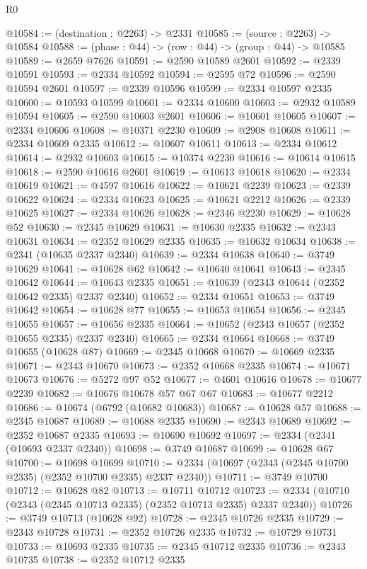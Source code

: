 \begin{lexlean}{R0}
\begin{coremodule}
@10584 := (destination : @2263) -> @2331
@10585 := (source : @2263) -> @10584
@10588 := (phase : @44) -> (row : @44) -> (group : @44) -> @10585
@10589 := @2659 @7626
@10591 := @2590 @10589 @2601
@10592 := @2339 @10591
@10593 := @2334 @10592
@10594 := @2595 @72
@10596 := @2590 @10594 @2601
@10597 := @2339 @10596
@10599 := @2334 @10597 @2335
@10600 := @10593 @10599
@10601 := @2334 @10600
@10603 := @2932 @10589 @10594
@10605 := @2590 @10603 @2601
@10606 := @10601 @10605
@10607 := @2334 @10606
@10608 := @10371 @2230
@10609 := @2908 @10608
@10611 := @2334 @10609 @2335
@10612 := @10607 @10611
@10613 := @2334 @10612
@10614 := @2932 @10603
@10615 := @10374 @2230
@10616 := @10614 @10615
@10618 := @2590 @10616 @2601
@10619 := @10613 @10618
@10620 := @2334 @10619
@10621 := @4597 @10616
@10622 := @10621 @2239
@10623 := @2339 @10622
@10624 := @2334 @10623
@10625 := @10621 @2212
@10626 := @2339 @10625
@10627 := @2334 @10626
@10628 := @2346 @2230
@10629 := @10628 @52
@10630 := @2345 @10629
@10631 := @10630 @2335
@10632 := @2343 @10631
@10634 := @2352 @10629 @2335
@10635 := @10632 @10634
@10638 := @2341 (@10635 @2337 @2340)
@10639 := @2334 @10638
@10640 := @3749 @10629
@10641 := @10628 @62
@10642 := @10640 @10641
@10643 := @2345 @10642
@10644 := @10643 @2335
@10651 := @10639 (@2343 @10644 (@2352 @10642 @2335) @2337 @2340)
@10652 := @2334 @10651
@10653 := @3749 @10642
@10654 := @10628 @77
@10655 := @10653 @10654
@10656 := @2345 @10655
@10657 := @10656 @2335
@10664 := @10652 (@2343 @10657 (@2352 @10655 @2335) @2337 @2340)
@10665 := @2334 @10664
@10668 := @3749 @10655 (@10628 @87)
@10669 := @2345 @10668
@10670 := @10669 @2335
@10671 := @2343 @10670
@10673 := @2352 @10668 @2335
@10674 := @10671 @10673
@10676 := @5272 @97 @52
@10677 := @4601 @10616
@10678 := @10677 @2239
@10682 := @10676 @10678 @57 @67 @67
@10683 := @10677 @2212
@10686 := @10674 (@6792 (@10682 @10683))
@10687 := @10628 @57
@10688 := @2345 @10687
@10689 := @10688 @2335
@10690 := @2343 @10689
@10692 := @2352 @10687 @2335
@10693 := @10690 @10692
@10697 := @2334 (@2341 (@10693 @2337 @2340))
@10698 := @3749 @10687
@10699 := @10628 @67
@10700 := @10698 @10699
@10710 := @2334 (@10697 (@2343 (@2345 @10700 @2335) (@2352 @10700 @2335) @2337 @2340))
@10711 := @3749 @10700
@10712 := @10628 @82
@10713 := @10711 @10712
@10723 := @2334 (@10710 (@2343 (@2345 @10713 @2335) (@2352 @10713 @2335) @2337 @2340))
@10726 := @3749 @10713 (@10628 @92)
@10728 := @2345 @10726 @2335
@10729 := @2343 @10728
@10731 := @2352 @10726 @2335
@10732 := @10729 @10731
@10733 := @10693 @2335
@10735 := @2345 @10712 @2335
@10736 := @2343 @10735
@10738 := @2352 @10712 @2335

\end{coremodule}
\end{lexlean}

